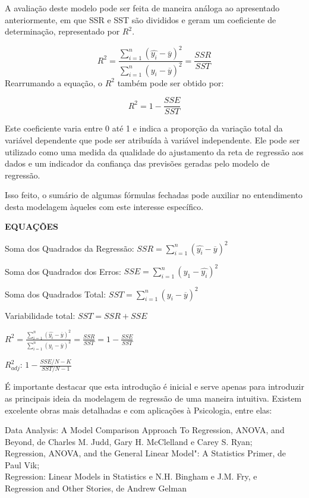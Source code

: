 \documentclass[
]{book}
\newenvironment{writing}{
  \definecolor{shadecolor}{rgb}{0, 0, 0}  %
  \color{white}
  \begin{shaded}}
 {\end{shaded}}
\begin{document}
A avaliação deste modelo pode ser feita de maneira análoga ao apresentado anteriormente, em que SSR e SST são divididos e geram um coeficiente de determinação, representado por \(R^2\).

\[R^2=\frac{\sum\limits_{i=1}^{n} (\widehat{y_i}-\overline{y})^2}{\sum\limits_{i=1}^{n} (y_i-\overline{y})^2} = \frac{SSR}{SST}\]
Rearrumando a equação, o \(R^2\) também pode ser obtido por:

\[R^2 = 1- \frac{SSE}{SST}\]

Este coeficiente varia entre 0 até 1 e indica a proporção da variação total da variável dependente que pode ser atribuída à variável independente. Ele pode ser utilizado como uma medida da qualidade do ajustamento da reta de regressão aos dados e um indicador da confiança das previsões geradas pelo modelo de regressão.

Isso feito, o sumário de algumas fórmulas fechadas pode auxiliar no entendimento desta modelagem àqueles com este interesse específico.

\begin{writing}

\textbf{EQUAÇÕES}

Soma dos Quadrados da Regressão: \(SSR = \sum\limits_{i=1}^{n} (\widehat{y_i}-\overline{y})^2\)

Soma dos Quadrados dos Erros: \(SSE = \sum\limits_{i=1}^{n} (y_1-\widehat{y_i})^2\)

Soma dos Quadrados Total: \(SST = \sum\limits_{i=1}^{n} (y_i-\overline{y})^2\)

Variabilidade total: \(SST = SSR + SSE\)

\(R^2= \frac{\sum\limits_{i=1}^{n} (\widehat{y_i}-\overline{y})^2}{\sum\limits_{i=1}^{n} (y_i-\overline{y})^2} = \frac{SSR}{SST} = 1 - \frac{SSE}{SST}\)

\(R^2_{adj}\): \(1-\frac{SSE/N-K}{SST/N-1}\)

\end{writing}

É importante destacar que esta introdução é inicial e serve apenas para introduzir as principais ideia da modelagem de regressão de uma maneira intuitiva. Existem excelente obras mais detalhadas e com aplicações à Psicologia, entre elas:

Data Analysis: A Model Comparison Approach To Regression, ANOVA, and Beyond, de Charles M. Judd, Gary H. McClelland e Carey S. Ryan;\\
Regression, ANOVA, and the General Linear Model": A Statistics Primer, de Paul Vik;\\
Regression: Linear Models in Statistics e N.H. Bingham e J.M. Fry, e\\
Regression and Other Stories, de Andrew Gelman
\end{document}
